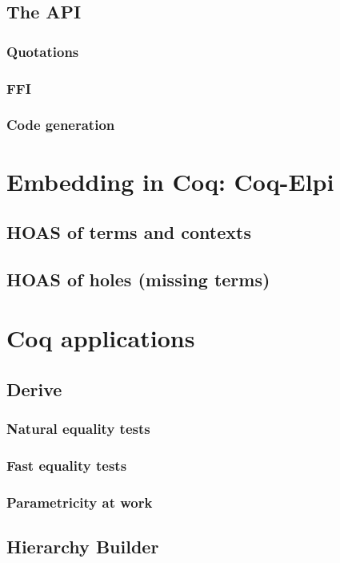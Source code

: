 \documentclass[a4paper, 11pt]{book}
\begin{document}
\section{The API}

\subsection{Quotations}
\subsection{FFI}
\subsection{Code generation}

\chapter{Embedding in Coq: Coq-Elpi}

\section{HOAS of terms and contexts}

\section{HOAS of holes (missing terms)}



\chapter{Coq applications}

\section{Derive}
\subsection{Natural equality tests}
\subsection{Fast equality tests}
\subsection{Parametricity at work}

\section{Hierarchy Builder}
\end{document}
